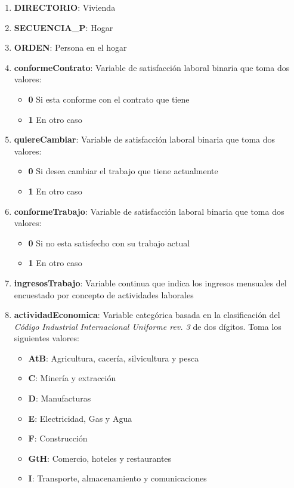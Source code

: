 \documentclass[12pt,a4paper]{article}
\begin{document}
\begin{enumerate}
	\item \textbf{DIRECTORIO}: Vivienda
	\item \textbf{SECUENCIA\_P}: Hogar 
	\item \textbf{ORDEN}: Persona en el hogar
	\item \textbf{conformeContrato}: Variable de satisfacción laboral binaria que toma dos valores:
	\begin{itemize}
		\item \textbf{0} Si esta conforme con el contrato que tiene
		\item \textbf{1} En otro caso
	\end{itemize}
	\item \textbf{quiereCambiar}: Variable de satisfacción laboral binaria que toma dos valores:
	\begin{itemize}
		\item \textbf{0} Si desea cambiar el trabajo que tiene actualmente
		\item \textbf{1} En otro caso
	\end{itemize}
	\item \textbf{conformeTrabajo}: Variable de satisfacción laboral binaria que toma dos valores:
	\begin{itemize}
		\item \textbf{0} Si no esta satisfecho con su trabajo actual
		\item \textbf{1} En otro caso
	\end{itemize}
	\item \textbf{ingresosTrabajo}: Variable continua que indica los ingresos mensuales del encuestado por concepto de actividades laborales
	\item \textbf{actividadEconomica}: Variable categórica basada en la clasificación del \textit{Código Industrial Internacional Uniforme rev. 3} de dos dígitos. Toma los siguientes valores:
	\begin{itemize}
		\item \textbf{AtB}: Agricultura, cacería, silvicultura y pesca
		\item \textbf{C}: Minería y extracción
		\item \textbf{D}: Manufacturas
		\item \textbf{E}: Electricidad, Gas y Agua
		\item \textbf{F}: Construcción
		\item \textbf{GtH}: Comercio, hoteles y restaurantes
		\item \textbf{I}: Transporte, almacenamiento y comunicaciones

\end{itemize}
\end{enumerate}
\end{document}
